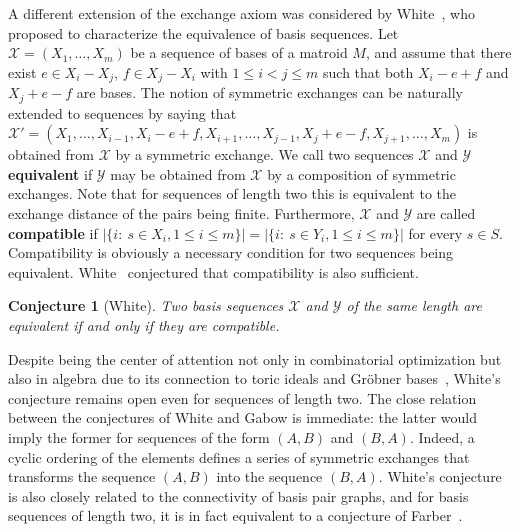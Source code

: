 \documentclass[11pt,a4paper]{article}
\theoremstyle{plain}
\newtheorem{conj}[thm]{Conjecture}
\theoremstyle{definition}
\newcommand{\mA}{\mathbf{A}}
\newcommand{\mB}{\mathbf{B}}
\newcommand{\cX}{\mathcal{X}}
\newcommand{\cY}{\mathcal{Y}}
\begin{document}
A different extension of the exchange axiom was considered by White~\cite{white1980unique}, who proposed to characterize the equivalence of basis sequences. Let $\cX=(X_1,\dots,X_m)$ be a sequence of bases of a matroid $M$, and assume that there exist $e\in X_i-X_j$, $f\in X_j-X_i$ with $1\leq i<j\leq m$ such that both $X_i-e+f$ and $X_j+e-f$ are bases. The notion of symmetric exchanges can be naturally extended to sequences by saying that $\cX'=(X_1,\dots,X_{i-1},X_i-e+f,X_{i+1},\dots,X_{j-1},X_j+e-f,X_{j+1},\dots,X_m)$ is obtained from $\cX$ by a symmetric exchange. We call two sequences $\cX$ and $\cY$ \textbf{equivalent} if $\cY$ may be obtained from $\cX$ by a composition of symmetric exchanges. Note that for sequences of length two this is equivalent to the exchange distance of the pairs being finite. Furthermore, $\cX$ and $\cY$ are called \textbf{compatible} if $|\{i:\ s\in X_i,1\leq i\leq m\}|=|\{i:\ s\in Y_i,1\leq i\leq m\}|$ for every $s \in S$. Compatibility is obviously a necessary condition for two sequences being equivalent. White~\cite{white1980unique} conjectured that compatibility is also sufficient.

\begin{conj}[White] \label{conj:white}
Two basis sequences $\cX$ and $\cY$ of the same length are equivalent if and only if they are compatible.
\end{conj}

Despite being the center of attention not only in combinatorial optimization but also in algebra due to its connection to toric ideals and Gröbner bases~\cite{blasiak2008toric}, White's conjecture remains open even for sequences of length two. The close relation between the conjectures of White and Gabow is immediate: the latter would imply the former for sequences of the form $(A,B)$ and $(B,A)$. Indeed, a cyclic ordering of the elements defines a series of symmetric exchanges that transforms the sequence $(A,B)$ into the sequence $(B,A)$. 
White's conjecture is also closely related to the connectivity of basis pair graphs, and for basis sequences of length two, it is in fact equivalent to a conjecture of Farber~\cite{farber1989basis,farber1985edge}.

\end{document}
